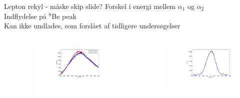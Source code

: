 \begin{frame}{Lepton rekyl - måske skip slide?}
	Forskel i energi mellem $\alpha_1$ og $\alpha_2$\\
	Indflydelse på $^8$Be peak\\
	Kan ikke undlades, som forslået af tidligere undersøgelser
	\begin{columns}
		\\
		\begin{figure}
			\includegraphics[width=\columnwidth]{../figures/recoil.pdf}
		\end{figure}
		\\
		\begin{figure}
			\includegraphics[width=\columnwidth]{../figures/recoilGauss.pdf}
		\end{figure}
	\end{columns}
\end{frame}

